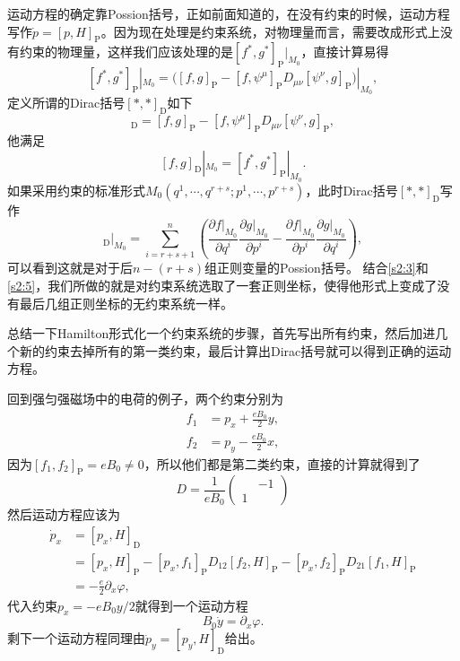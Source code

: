 运动方程的确定靠Possion括号，正如前面知道的，在没有约束的时候，运动方程写作$\dot{p}=[p,H]_{\mathrm{P}}$。因为现在处理是约束系统，对物理量而言，需要改成形式上没有约束的物理量，这样我们应该处理的是$[f^*,g^*]_{\mathrm{P}}|_{M_0}$，直接计算易得
\[
	[f^*,g^*]_{\mathrm{P}}|_{M_0}=\bigl([f,g]_{\mathrm{P}}-[f,\psi^\mu]_{\mathrm{P}}D_{\mu\nu}[\psi^\nu,g]_{\mathrm{P}}\bigr)|_{M_0},
\]
定义所谓的Dirac括号$[*,*]_{\mathrm{D}}$如下
\begin{equation}
	[f,g]_{\mathrm{D}}=[f,g]_{\mathrm{P}}-[f,\psi^\mu]_{\mathrm{P}}D_{\mu\nu}[\psi^\nu,g]_{\mathrm{P}},
	\label{s2:4}
\end{equation}
他满足
\[
	[f,g]_{\mathrm{D}}|_{M_0}=[f^*,g^*]_{\mathrm{P}}|_{M_0}.
\]
如果采用约束的标准形式$M_0(q^1,\cdots,q^{r+s};p^1,\cdots,p^{r+s})$，此时Dirac括号$[*,*]_{\mathrm{D}}$写作
\begin{equation}
	[f,g]_{\mathrm{D}}|_{M_0}=\sum_{i=r+s+1}^{n}\left(\frac{\partial f|_{M_0}}{\partial q^i}\frac{\partial g|_{M_0}}{\partial p^i}-\frac{\partial f|_{M_0}}{\partial p^i}\frac{\partial g|_{M_0}}{\partial q^i}\right),
	\label{s2:5}
\end{equation}
可以看到这就是对于后$n-(r+s)$组正则变量的Possion括号。
结合\eqref{s2:3}和\eqref{s2:5}，我们所做的就是对约束系统选取了一套正则坐标，使得他形式上变成了没有最后几组正则坐标的无约束系统一样。

总结一下Hamilton形式化一个约束系统的步骤，首先写出所有约束，然后加进几个新的约束去掉所有的第一类约束，最后计算出Dirac括号就可以得到正确的运动方程。

回到强匀强磁场中的电荷的例子，两个约束分别为
\begin{align*}
	f_1&=p_x+\frac{eB_0}{2}y,\\
	f_2&=p_y-\frac{eB_0}{2}x,
\end{align*}
因为$[f_1,f_2]_{\mathrm{P}}=eB_0\neq 0$，所以他们都是第二类约束，直接的计算就得到了
\[
	D=\frac{1}{eB_0}\begin{pmatrix}
	&-1\\
	1&
	\end{pmatrix}
\]
然后运动方程应该为
\begin{align*}
	\dot{p}_x&=[p_x,H]_{\mathrm{D}}\\
	&=[p_x,H]_{\mathrm{P}}-[p_x,f_1]_{\mathrm{P}}D_{12}[f_2,H]_{\mathrm{P}}-[p_x,f_2]_{\mathrm{P}}D_{21}[f_1,H]_{\mathrm{P}}\\
	&=-\frac{e}{2}\partial_x \varphi,
\end{align*}
代入约束$p_x=-eB_0y/2$就得到一个运动方程
\[
	B_0\dot{y}=\partial_x \varphi.
\]
剩下一个运动方程同理由$\dot{p}_y=[p_y,H]_{\mathrm{D}}$给出。

